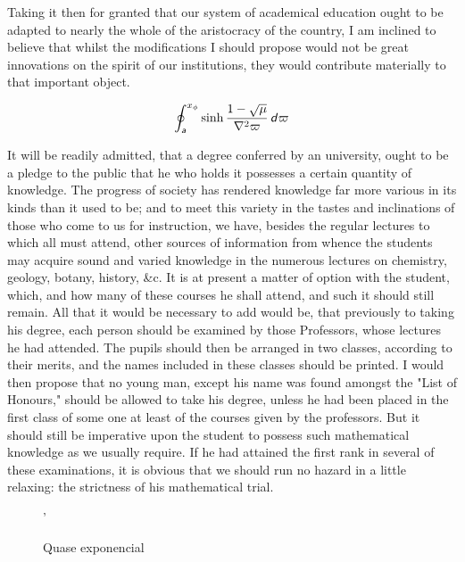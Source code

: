 \documentclass{aa}
\begin{document}
Taking it then for granted that our system of academical education ought
to be adapted to nearly the whole of the aristocracy of the country, I
am inclined to believe that whilst the modifications I should propose
would not be great innovations on the spirit of our institutions, they
would contribute materially to that important object.

\begin{equation}
    \oint_{\textsf{\textit{a}}}^{x_\phi} \sinh \frac{1 - \sqrt{\mu}}{\nabla^2\varpi} \, \textsf{\textit{d}}\varpi
    \label{IntegralBolada}
\end{equation}

It will be readily admitted, that a degree conferred by an university,
ought to be a pledge to the public that he who holds it possesses a
certain quantity of knowledge. The progress of society has rendered
knowledge far more various in its kinds than it used to be; and to meet
this variety in the tastes and inclinations of those who come to us for
instruction, we have, besides the regular lectures to which all must
attend, other sources of information from whence the students may
acquire sound and varied knowledge in the numerous lectures on
chemistry, geology, botany, history, \&c. It is at present a matter of
option with the student, which, and how many of these courses he shall
attend, and such it should still remain. All that it would be necessary
to add would be, that previously to taking his degree, each person
should be examined by those Professors, whose lectures he had attended.
The pupils should then be arranged in two classes, according to their
merits, and the names included in these classes should be printed. I
would then propose that no young man, except his name was found amongst
the "List of Honours," should be allowed to take his degree, unless he
had been placed in the first class of some one at least of the courses
given by the professors. But it should still be imperative upon the
student to possess such mathematical knowledge as we usually require. If
he had attained the first rank in several of these examinations, it
is obvious that we should run no hazard in a little relaxing: the
strictness of his mathematical trial.

\begin{figure*}
    '
    \caption[]{Quase exponencial}
    \label{QuaseExp}
\end{figure*}
\end{document}
